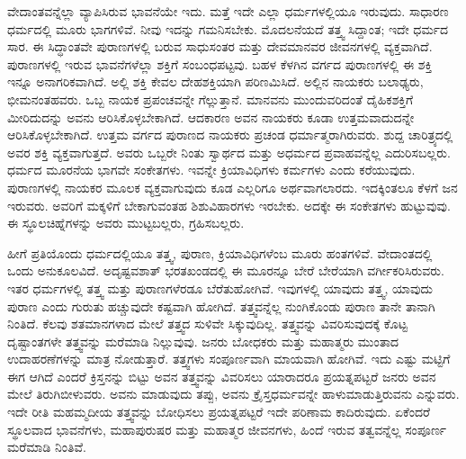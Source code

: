 ವೇದಾಂತವನ್ನೆಲ್ಲಾ ವ್ಯಾಪಿಸಿರುವ ಭಾವನೆಯೇ ಇದು. ಮತ್ತೆ ಇದೇ ಎಲ್ಲಾ ಧರ್ಮಗಳಲ್ಲಿಯೂ ಇರುವುದು. ಸಾಧಾರಣ ಧರ್ಮದಲ್ಲಿ ಮೂರು ಭಾಗಗಳಿವೆ. ನೀವು ಇದನ್ನು ಗಮನಿಸಬೇಕು. ಮೊದಲನೆಯದೆ ತತ್ತ್ವ ಸಿದ್ದಾಂತ; ಇದೇ ಧರ್ಮದ ಸಾರ. ಈ ಸಿದ್ಧಾಂತವೇ ಪುರಾಣಗಳಲ್ಲಿ ಬರುವ ಸಾಧುಸಂತರ ಮತ್ತು ದೇವಮಾನವರ ಜೀವನಗಳಲ್ಲಿ ವ್ಯಕ್ತವಾಗಿದೆ. ಪುರಾಣಗಳಲ್ಲಿ ಇರುವ ಭಾವನೆಗಳೆಲ್ಲಾ ಶಕ್ತಿಗೆ ಸಂಬಂಧಪಟ್ಟವು. ಬಹಳ ಕೆಳಗಿನ ವರ್ಗದ ಪುರಾಣಗಳಲ್ಲಿ ಈ ಶಕ್ತಿ ಇನ್ನೂ ಅನಾಗರಿಕವಾಗಿದೆ. ಅಲ್ಲಿ ಶಕ್ತಿ ಕೇವಲ ದೇಹಶಕ್ತಿಯಾಗಿ ಪರಿಣಮಿಸಿದೆ. ಅಲ್ಲಿನ ನಾಯಕರು ಬಲಾಢ್ಯರು, ಭೀಮನಂತಹವರು. ಒಬ್ಬ ನಾಯಕ ಪ್ರಪಂಚವನ್ನೇ ಗೆಲ್ಲುತ್ತಾನೆ. ಮಾನವನು ಮುಂದುವರಿದಂತೆ ದೈಹಿಕಶಕ್ತಿಗೆ ಮೀರಿದುದನ್ನು ಅವನು ಆರಿಸಿಕೊಳ್ಳಬೇಕಾಗಿದೆ. ಆದಕಾರಣ ಅವನ ನಾಯಕರು ಕೂಡಾ ಉತ್ತಮವಾದುದನ್ನೇ ಆರಿಸಿಕೊಳ್ಳಬೇಕಾಗಿದೆ. ಉತ್ತಮ ವರ್ಗದ ಪುರಾಣದ ನಾಯಕರು ಪ್ರಚಂಡ ಧರ್ಮಾತ್ಮರಾಗಿರುವರು. ಶುದ್ದ ಚಾರಿತ್ರ್ಯದಲ್ಲಿ ಅವರ ಶಕ್ತಿ ವ್ಯಕ್ತವಾಗುತ್ತದೆ. ಅವರು ಒಬ್ಬರೇ ನಿಂತು ಸ್ವಾರ್ಥದ ಮತ್ತು ಅಧರ್ಮದ ಪ್ರವಾಹವನ್ನೆಲ್ಲ ಎದುರಿಸಬಲ್ಲರು. ಧರ್ಮದ ಮೂರನೆಯ ಭಾಗವೇ ಸಂಕೇತಗಳು. ಇವನ್ನೇ ಕ್ರಿಯಾವಿಧಿಗಳು ಕರ್ಮಗಳು ಎಂದು ಕರೆಯುವುದು. ಪುರಾಣಗಳಲ್ಲಿ ನಾಯಕರ ಮೂಲಕ ವ್ಯಕ್ತವಾಗುವುದು ಕೂಡ ಎಲ್ಲರಿಗೂ ಅರ್ಥವಾಗಲಾರದು. ಇದಕ್ಕಿಂತಲೂ ಕೆಳಗೆ ಜನ ಇರುವರು. ಅವರಿಗೆ ಮಕ್ಕಳಿಗೆ ಬೇಕಾಗುವಂತಹ ಶಿಶುವಿಹಾರಗಳು ಇರಬೇಕು. ಅದಕ್ಕೇ ಈ ಸಂಕೇತಗಳು ಹುಟ್ಟುವುವು. ಈ ಸ್ಥೂಲಚಿಹ್ನೆಗಳನ್ನು ಅವರು ಮುಟ್ಟಬಲ್ಲರು, ಗ್ರಹಿಸಬಲ್ಲರು.

ಹೀಗೆ ಪ್ರತಿಯೊಂದು ಧರ್ಮದಲ್ಲಿಯೂ ತತ್ತ್ವ, ಪುರಾಣ, ಕ್ರಿಯಾವಿಧಿಗಳೆಂಬ ಮೂರು ಹಂತಗಳಿವೆ. ವೇದಾಂತದಲ್ಲಿ ಒಂದು ಅನುಕೂಲವಿದೆ. ಅದೃಷ್ಟವಶಾತ್ ಭರತಖಂಡದಲ್ಲಿ ಈ ಮೂರನ್ನೂ ಬೇರೆ ಬೇರೆಯಾಗಿ ವರ್ಗೀಕರಿಸಿರುವರು. ಇತರ ಧರ್ಮಗಳಲ್ಲಿ ತತ್ತ್ವ ಮತ್ತು ಪುರಾಣಗಳೆರಡೂ ಬೆರೆತುಹೋಗಿವೆ. ಇವುಗಳಲ್ಲಿ ಯಾವುದು ತತ್ತ್ವ, ಯಾವುದು ಪುರಾಣ ಎಂದು ಗುರುತು ಹಚ್ಚುವುದೇ ಕಷ್ಟವಾಗಿ ಹೋಗಿದೆ. ತತ್ತ್ವವನ್ನೆಲ್ಲ ನುಂಗಿಕೊಂಡು ಪುರಾಣ ತಾನೇ ತಾನಾಗಿ ನಿಂತಿದೆ. ಕೆಲವು ಶತಮಾನಗಳಾದ ಮೇಲೆ ತತ್ತ್ವದ ಸುಳಿವೇ ಸಿಕ್ಕುವುದಿಲ್ಲ. ತತ್ತ್ವವನ್ನು ವಿವರಿಸುವುದಕ್ಕೆ ಕೊಟ್ಟ ದೃಷ್ಟಾಂತಗಳೇ ತತ್ತ್ವವನ್ನು ಮರೆಮಾಡಿ ನಿಲ್ಲುವುವು. ಜನರು ಬೋಧಕರು ಮತ್ತು ಮಹಾತ್ಮರು ಮುಂತಾದ ಉದಾಹರಣೆಗಳನ್ನು ಮಾತ್ರ ನೋಡುತ್ತಾರೆ. ತತ್ತ್ವಗಳು ಸಂಪೂರ್ಣವಾಗಿ ಮಾಯವಾಗಿ ಹೋಗಿವೆ. ಇದು ಎಷ್ಟು ಮಟ್ಟಿಗೆ ಈಗ ಆಗಿದೆ ಎಂದರೆ ಕ್ರಿಸ್ತನನ್ನು ಬಿಟ್ಟು ಅವನ ತತ್ತ್ವವನ್ನು ವಿವರಿಸಲು ಯಾರಾದರೂ ಪ್ರಯತ್ನಪಟ್ಟರೆ ಜನರು ಅವನ ಮೇಲೆ ತಿರುಗಿಬೀಳುವರು. ಅವನು ಮಾಡುವುದು ತಪ್ಪು, ಅವನು ಕ್ರೈಸ್ತಧರ್ಮವನ್ನೇ ಹಾಳುಮಾಡುತ್ತಿರುವನು ಎನ್ನುವರು. ಇದೇ ರೀತಿ ಮಹಮ್ಮದೀಯ ತತ್ತ್ವವನ್ನು ಬೋಧಿಸಲು ಪ್ರಯತ್ನಪಟ್ಟರೆ ಇದೇ ಪರಿಣಾಮ ಕಾದಿರುವುದು. ಏಕೆಂದರೆ ಸ್ಥೂಲವಾದ ಭಾವನೆಗಳು, ಮಹಾಪುರುಷರ ಮತ್ತು ಮಹಾತ್ಮರ ಜೀವನಗಳು, ಹಿಂದೆ ಇರುವ ತತ್ವವನ್ನೆಲ್ಲ ಸಂಪೂರ್ಣ ಮರೆಮಾಡಿ ನಿಂತಿವೆ.

